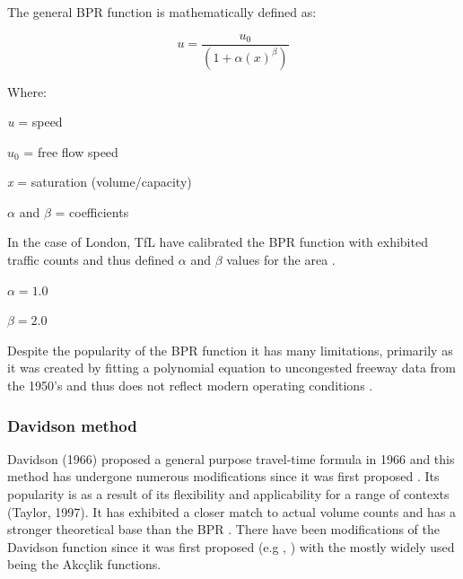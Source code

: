 \documentclass{CUP-JNL-DCE}
\begin{document}
\vspace{2mm}

The general BPR function is mathematically defined as:

\begin{equation}
	u = \frac{u_{0}}{(1 +  \alpha(x)^\beta ) }
\end{equation}

Where:

\vspace{2mm}
\textit{u} = speed

\vspace{2mm}
$u_{0}$ = free flow speed 

\vspace{2mm}
\textit{x} = saturation (volume/capacity)

\vspace{2mm}
$\alpha$ and $\beta$ = coefficients

\vspace{2mm}

In the case of London, TfL have calibrated the BPR function with exhibited traffic counts and thus defined $\alpha$ and $\beta$ values for the area \citep{tfl_modelling_guidelines}.

\vspace{2mm}
$ \alpha = 1.0 $

\vspace{2mm}
$ \beta = 2.0 $
\vspace{2mm}

Despite the popularity of the BPR function it has many limitations, primarily as it was created by fitting a polynomial equation to uncongested freeway data from the 1950's and thus does not reflect modern operating conditions \citep{skabardonis1997improved}.

\subsubsection{Davidson method}

Davidson (1966) proposed a general purpose travel-time formula in 1966 and this method has undergone numerous modifications since it was first proposed \citep{mtoi2014calibration}. Its popularity is as a result of its flexibility and applicability for a range of contexts (Taylor, 1997). It has exhibited a closer match to actual volume counts and has a stronger theoretical base than the BPR \citep{rose1989estimating}. There have been modifications of the Davidson function since it was first proposed (e.g \citep{tisato1991suggestions}, \citep{akcelik1991travel} ) with the mostly widely used being the Akcçlik functions.
\end{document}
